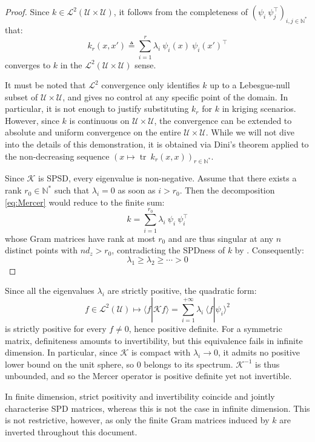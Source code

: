 \begin{proof}
	Since $k\in\mathcal{L}^2(\mathcal{U}\times\mathcal{U})$, it follows from the completeness of $(\psi_i\:\psi_j^\top)_{i,j\in\mathbb{N}^*}$ that:
	\begin{equation}
		k_r(x,x')\triangleq\sum_{i=1}^{r}\lambda_i\:\psi_i(x)\:\psi_i(x')^\top
	\end{equation}
	converges to $k$ in the $\mathcal{L}^2(\mathcal{U}\times\mathcal{U})$ sense.

	It must be noted that $\mathcal{L}^2$ convergence only identifies $k$ up to a Lebesgue-null subset of $\mathcal{U}\times\mathcal{U}$, and gives no control at any specific point of the domain. In particular, it is not enough to justify substituting $k_r$ for $k$ in kriging scenarios. However, since $k$ is continuous on $\mathcal{U}\times\mathcal{U}$, the convergence can be extended to absolute and uniform convergence on the entire $\mathcal{U}\times\mathcal{U}$. While we will not dive into the details of this demonstration, it is obtained via Dini's theorem applied to the non-decreasing sequence $\left(x\mapsto\operatorname{tr}\:k_r(x,x)\right)_{r\in\mathbb{N}^*}$.

	Since $\mathcal{K}$ is SPSD, every eigenvalue is non-negative. Assume that there exists a rank $r_0\in\mathbb{N}^*$ such that $\lambda_i=0$ as soon as $i>r_0$. Then the decomposition \eqref{eq:Mercer} would reduce to the finite sum:
	\begin{equation}
		k=\sum_{i=1}^{r_0}\lambda_i\:\psi_i\:\psi_i^\top
	\end{equation}
	whose Gram matrices have rank at most $r_0$ and are thus singular at any $n$ distinct points with $nd_z>r_0$, contradicting the SPDness of $k$ by . Consequently:
	\begin{equation}
		\lambda_1\geq\lambda_2\geq\cdots>0
	\end{equation}
\end{proof}

\begin{remark}
	Since all the eigenvalues $\lambda_i$ are strictly positive, the quadratic form:
	\begin{equation}
		f\in\mathcal{L}^2(\mathcal{U})\mapsto\langle f|\mathcal{K}f\rangle=\sum_{i=1}^{+\infty}\lambda_i\:\langle f|\psi_i\rangle^2
	\end{equation}
	is strictly positive for every $f\neq0$, hence positive definite. For a symmetric matrix, definiteness amounts to invertibility, but this equivalence fails in infinite dimension. In particular, since $\mathcal{K}$ is compact with $\lambda_i\to0$, it admits no positive lower bound on the unit sphere, so $0$ belongs to its spectrum. $\mathcal{K}^{-1}$ is thus unbounded, and so the Mercer operator is positive definite yet not invertible.

	In finite dimension, strict positivity and invertibility coincide and jointly characterise SPD matrices, whereas this is not the case in infinite dimension. This is not restrictive, however, as only the finite Gram matrices induced by $k$ are inverted throughout this document.
\end{remark}

